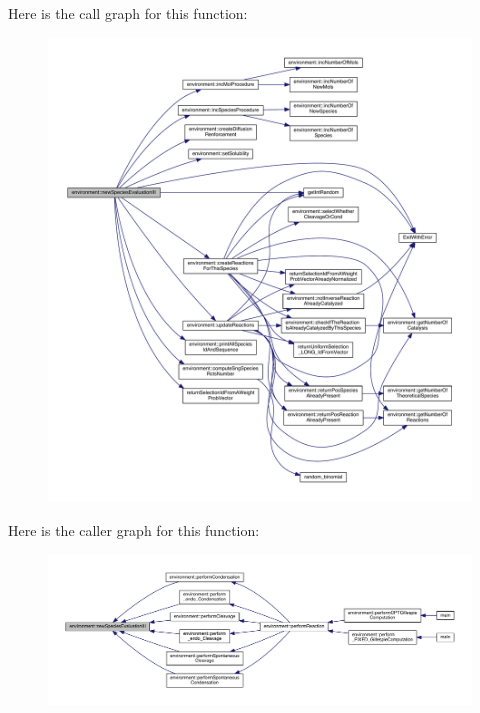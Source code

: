 Here is the call graph for this function\+:\nopagebreak
\begin{figure}[H]
\begin{center}
\leavevmode
\includegraphics[width=350pt]{a00013_a4fe7891fb38f3f25bb82769af0ddfe19_cgraph}
\end{center}
\end{figure}




Here is the caller graph for this function\+:\nopagebreak
\begin{figure}[H]
\begin{center}
\leavevmode
\includegraphics[width=350pt]{a00013_a4fe7891fb38f3f25bb82769af0ddfe19_icgraph}
\end{center}
\end{figure}


